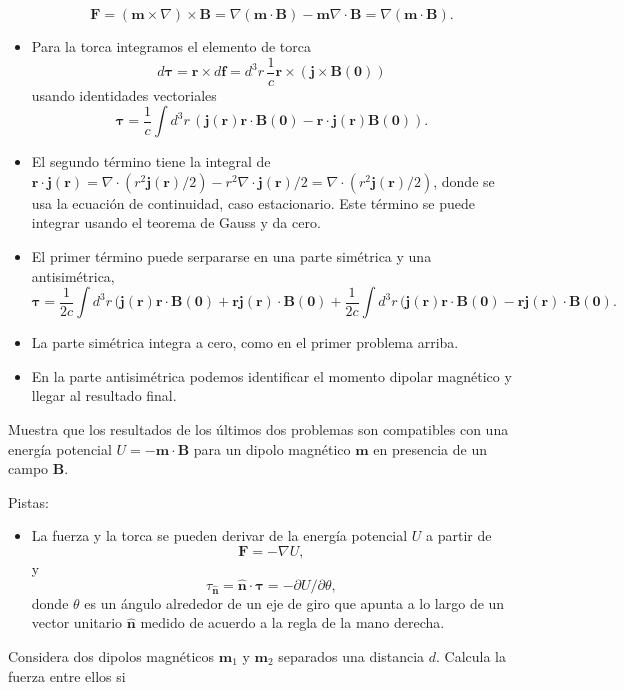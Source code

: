 \documentclass{exam}
\begin{document}
\begin{questions}
\begin{itemize}
    $$\bm F=(\bm m\times\nabla)\times \bm B=\nabla(\bm m\cdot\bm
    B)-\bm m\nabla\cdot\bm B=\nabla(\bm m\cdot\bm B).
    $$
  \item Para la torca integramos el elemento de torca
    $$
    d\bm\tau= \bm r\times d\bm f=d^3r\, \frac{1}{c}\bm r\times(\bm j\times\bm B(\bm 0))
    $$
    usando identidades vectoriales
    $$
    \bm \tau=\frac{1}{c}\int d^3r\, (\bm j(\bm r)\bm r\cdot\bm B(\bm 0)-\bm
    r\cdot\bm j(\bm r) \bm B(\bm 0)).
    $$
  \item El segundo término tiene la integral de $\bm r\cdot\bm j(\bm
    r)=\nabla\cdot (r^2\bm j(\bm r)/2)-r^2\nabla\cdot\bm j(\bm
    r)/2=\nabla\cdot (r^2\bm j(\bm r)/2)$, donde se usa la ecuación de
    continuidad, caso estacionario. Este término se puede integrar
    usando el teorema de Gauss y da cero.
  \item El primer término puede serpararse en una parte simétrica y
    una antisimétrica,
    $$
    \bm \tau=\frac{1}{2c}\int d^3r\, (\bm j(\bm r)\bm r\cdot\bm B(\bm
    0)+ \bm r\bm j(\bm r)\cdot\bm B(\bm 0)+\frac{1}{2c}\int d^3r\, (\bm j(\bm r)\bm r\cdot\bm B(\bm
    0)- \bm r\bm j(\bm r)\cdot\bm B(\bm 0).
    $$
  \item La parte simétrica integra a cero, como en el primer problema
    arriba.
  \item En la parte antisimétrica podemos identificar el momento
    dipolar magnético y llegar al resultado final.
  \end{itemize}
\question Muestra que los resultados de los últimos dos problemas son
  compatibles con una energía potencial $U=-\bm m\cdot \bm B$ para un
  dipolo magnético $\bm m$ en presencia de un campo $\bm B$.

  Pistas:
  \begin{itemize}
  \item La fuerza y la torca se pueden derivar de la energía potencial
    $U$ a partir de
    $$
    \bm F=-\nabla U,
    $$
    y
    $$
    \tau_{\hat{\bm n}}=\hat{\bm n}\cdot\bm \tau=-\partial U/\partial\theta,
    $$
    donde $\theta$ es un ángulo alrededor de un eje de giro que apunta
    a lo largo de un vector unitario $\hat{\bm n}$ medido de acuerdo a
    la regla de la mano derecha.
  \end{itemize}


\question Considera dos dipolos magnéticos $\bm m_1$ y $\bm m_2$
  separados una distancia $d$. Calcula la fuerza entre ellos si
\end{questions}
\end{document}
